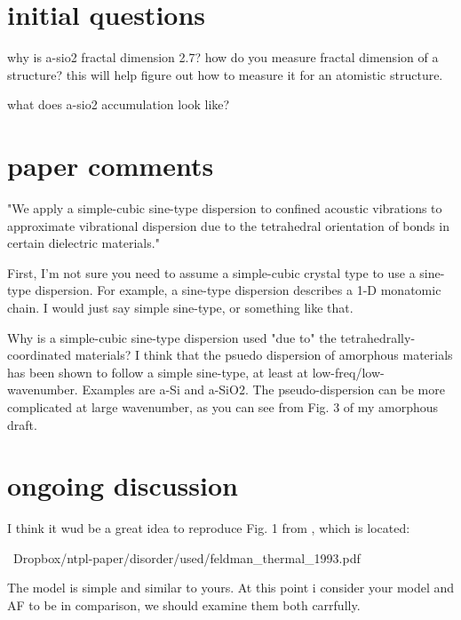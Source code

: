 \documentclass{article}
\begin{document}
\section{initial questions}
why is a-sio2 fractal dimension 2.7? how do you measure fractal dimension 
of a structure? this will help figure out how to measure it for an 
atomistic structure.

what does a-sio2 accumulation look like?

\section{paper comments}
"We apply a simple-cubic sine-type dispersion to confined acoustic 
vibrations to approximate vibrational dispersion due to the tetrahedral 
orientation of bonds in certain dielectric materials."

First, I'm not sure you need to assume a simple-cubic crystal type to 
use a sine-type dispersion. For example, a sine-type dispersion describes 
a 1-D monatomic chain. I would just say simple sine-type, or something 
like that.

Why is a simple-cubic sine-type dispersion used "due to" the 
tetrahedrally-coordinated materials? I think  that the psuedo dispersion 
of amorphous materials has been shown to follow a simple sine-type, at 
least at low-freq/low-wavenumber.  Examples are a-Si and a-SiO2. The 
pseudo-dispersion can be more complicated at large wavenumber, 
as you can see from Fig. 3 of my amorphous draft.


\section{ongoing discussion}
I think it wud be a great idea to reproduce Fig. 1 from \cite{feldman_thermal_1993}, which is located:




~Dropbox/ntpl-paper/disorder/used/feldman_thermal_1993.pdf




The model is simple and similar to yours. At this point i consider your model and AF to be in comparison, we should examine them both carrfully. 
\end{document}
